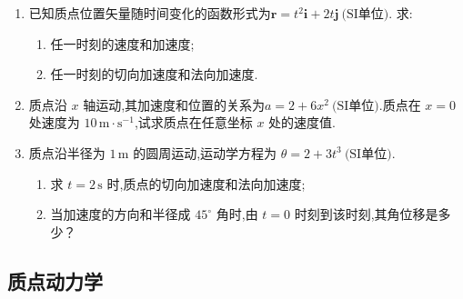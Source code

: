 \begin{enumerate}
	\vspace{6cm}
	
	\item[\textbf{1-20}] 已知质点位置矢量随时间变化的函数形式为$\mathbf{r}=t^2\mathbf{i}+2t\mathbf{j}\ \text{(SI单位)}.$
	求:
	\begin{enumerate}
		\item 任一时刻的速度和加速度;
		\item 任一时刻的切向加速度和法向加速度.
	\end{enumerate}
	
	\vspace{5cm}
	
	\item[\textbf{1-25}] 质点沿 \(x\) 轴运动,其加速度和位置的关系为$a=2+6x^2\ \text{(SI单位)}.$质点在 \(x=0\) 处速度为 \(10\,\text{m}\cdot\text{s}^{-1}\),试求质点在任意坐标 \(x\) 处的速度值.
	
	\vspace{5cm}
	
	\item[\textbf{1-26}] 质点沿半径为 \(1\,\text{m}\) 的圆周运动,运动学方程为
	$\theta=2+3t^3\ \text{(SI单位)}.$
	
	\begin{enumerate}
		\item 求 \(t=2\,\text{s}\) 时,质点的切向加速度和法向加速度;
		\item 当加速度的方向和半径成 \(45^\circ\) 角时,由 \(t=0\) 时刻到该时刻,其角位移是多少？
	\end{enumerate}
	
\end{enumerate}


\newpage
\subsection{质点动力学}

